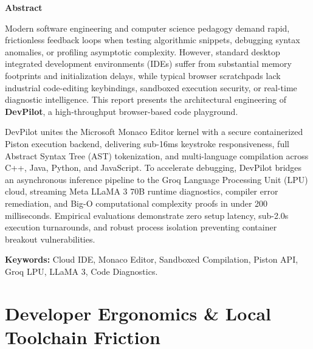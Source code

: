 \documentclass[12pt,a4paper]{report}
\begin{document}
\begin{center}
    {\Large \textbf{Abstract}}
\end{center}
\vspace{0.5cm}

Modern software engineering and computer science pedagogy demand rapid, frictionless feedback loops when testing algorithmic snippets, debugging syntax anomalies, or profiling asymptotic complexity. However, standard desktop integrated development environments (IDEs) suffer from substantial memory footprints and initialization delays, while typical browser scratchpads lack industrial code-editing keybindings, sandboxed execution security, or real-time diagnostic intelligence. This report presents the architectural engineering of \textbf{DevPilot}, a high-throughput browser-based code playground.

DevPilot unites the Microsoft Monaco Editor kernel with a secure containerized Piston execution backend, delivering sub-16ms keystroke responsiveness, full Abstract Syntax Tree (AST) tokenization, and multi-language compilation across C++, Java, Python, and JavaScript. To accelerate debugging, DevPilot bridges an asynchronous inference pipeline to the Groq Language Processing Unit (LPU) cloud, streaming Meta LLaMA 3 70B runtime diagnostics, compiler error remediation, and Big-O computational complexity proofs in under 200 milliseconds. Empirical evaluations demonstrate zero setup latency, sub-2.0s execution turnarounds, and robust process isolation preventing container breakout vulnerabilities.

\vspace{0.8cm}
\noindent \textbf{Keywords:} Cloud IDE, Monaco Editor, Sandboxed Compilation, Piston API, Groq LPU, LLaMA 3, Code Diagnostics.

\cleardoublepage
\tableofcontents

\cleardoublepage
{}
\setcounter{page}{1}

\chapter{Developer Ergonomics \& Local Toolchain Friction}
\end{document}
